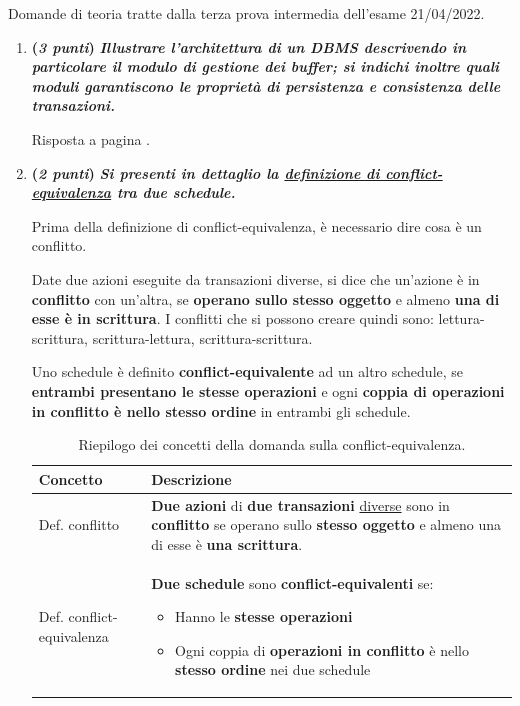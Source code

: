 \documentclass[a4paper]{article}
\begin{document}
	Domande di teoria tratte dalla terza prova intermedia dell'esame 21/04/2022.
	\begin{enumerate}
		\item \textbf{(\emph{3 punti})} \textcolor{Green4}{\textbf{\emph{Illustrare l'architettura di un DBMS descrivendo in particolare il modulo di gestione dei buffer; si indichi inoltre quali moduli garantiscono le proprietà di persistenza e consistenza delle transazioni.}}}
		
		Risposta a pagina \pageref{dom: gestione del buffer}.
		
		\item \textbf{(\emph{2 punti})} \textcolor{Green4}{\textbf{\emph{Si presenti in dettaglio la \underline{definizione di conflict-equivalenza} tra due schedule.}}}\label{dom: conflict-equivalenza}
		
		Prima della definizione di conflict-equivalenza, è necessario dire cosa è un conflitto.
		
		Date due azioni eseguite da transazioni diverse, si dice che un'azione è in \textbf{conflitto} con un'altra, se \textbf{operano sullo stesso oggetto} e almeno \textbf{una di esse è in scrittura}. I conflitti che si possono creare quindi sono: lettura-scrittura, scrittura-lettura, scrittura-scrittura.
		
		Uno schedule è definito \textbf{conflict-equivalente} ad un altro schedule, se \textbf{entrambi presentano le stesse operazioni} e ogni \textbf{coppia di operazioni in conflitto è nello stesso ordine} in entrambi gli schedule.
		
		\begin{table}[!htp]
			\centering
			\begin{tabular}{@{} l p{20em} @{}}
				\toprule
				Concetto & Descrizione \\
				\midrule
				Def. conflitto				& \textbf{Due azioni} di \textbf{due transazioni} \underline{diverse} sono in \textbf{conflitto} se operano sullo \textbf{stesso oggetto} e almeno una di esse è \textbf{una scrittura}. \\ [.7em]
				Def. conflict-equivalenza 	& \textbf{Due schedule} sono \textbf{conflict-equivalenti} se:
				\begin{itemize}
					\item Hanno le \textbf{stesse operazioni}
					
					\item Ogni coppia di \textbf{operazioni in conflitto} è nello \textbf{stesso ordine} nei due schedule
				\end{itemize}\\
				\bottomrule
			\end{tabular}
			\caption{Riepilogo dei concetti della domanda sulla conflict-equivalenza.}
		\end{table}\newpage
		

\end{enumerate}
\end{document}
